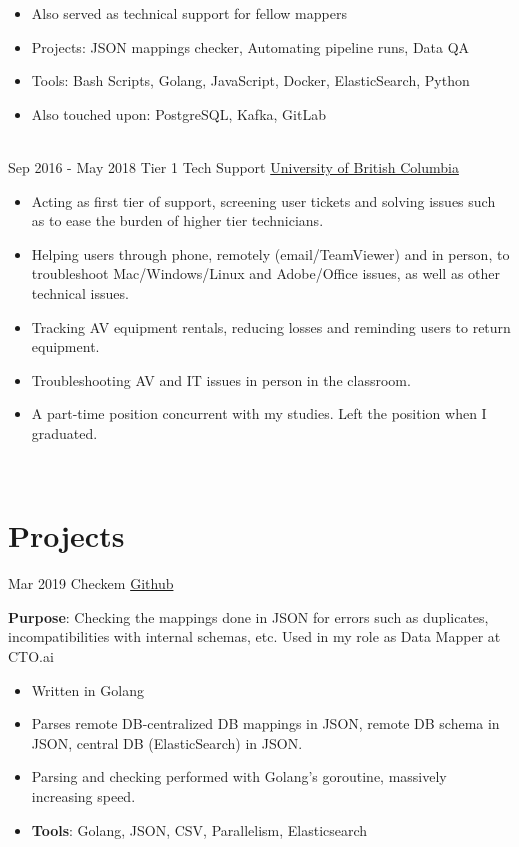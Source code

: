 \documentclass[letterpaper]{twentysecondcv} %
\begin{document}
\begin{twenty}
{\begin{itemize}
		\item Also served as technical support for fellow mappers
		\item Projects: JSON mappings checker, Automating pipeline runs, Data QA
		\item Tools: Bash Scripts, Golang, JavaScript, Docker, ElasticSearch, Python
		\item Also touched upon: PostgreSQL, Kafka, GitLab
		\end{itemize}}
	\\
	\twentyitem
	{Sep 2016 -}
	{May 2018}
	{Tier 1 Tech Support}
	{\href{http://ubc.ca/}{University of British Columbia}}
	{}
	{\begin{itemize}
		\item Acting as first tier of support, screening user tickets and solving issues such as to ease the burden of higher tier technicians.
		\item Helping users through phone, remotely (email/TeamViewer) and in person, to troubleshoot Mac/Windows/Linux and Adobe/Office issues, as well as other technical issues.
		\item Tracking AV equipment rentals, reducing losses and reminding users to return equipment.
		\item Troubleshooting AV and IT issues in person in the classroom.
		\item A part-time position concurrent with my studies. Left the position when I graduated.
		\end{itemize}}
	\\   
		        
\end{twenty}

\section{Projects}
\begin{twenty}
	\twentyitem
	{Mar 2019}
	{}
	{Checkem}
	{\href{https://github.com/aschereT/checkem/}{Github}}
	{}
	{
		\textbf{Purpose}: Checking the mappings done in JSON for errors such as duplicates, incompatibilities with internal schemas, etc.
		Used in my role as Data Mapper at CTO.ai
		{\begin{itemize}
			\item Written in Golang
			\item Parses remote DB-centralized DB mappings in JSON, remote DB schema in JSON, central DB (ElasticSearch) in JSON.
			\item Parsing and checking performed with Golang's goroutine, massively increasing speed.
			\item \textbf{Tools}: Golang, JSON, CSV, Parallelism, Elasticsearch \vspace{2mm}
			\end{itemize}}
	}
\end{twenty}
\end{document}

